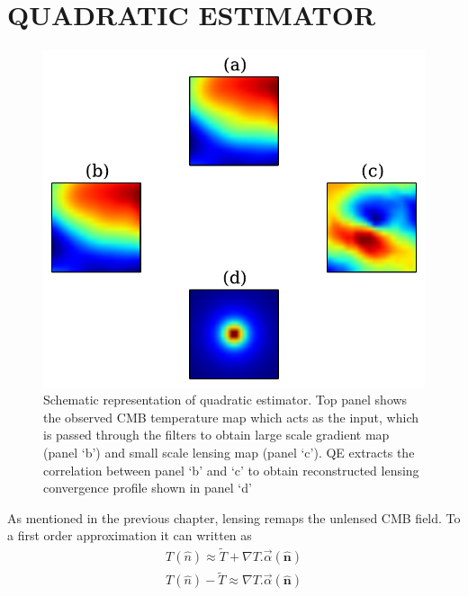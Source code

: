 \section{QUADRATIC ESTIMATOR}
\label{qe}
\begin{figure}[!ht]
\includegraphics[width=\linewidth]{figs/QE_schem.pdf}
\caption{Schematic representation of quadratic estimator. Top panel shows the observed CMB temperature map which acts as the input, which is passed through the filters to obtain large scale gradient map (panel `b') and small scale lensing map (panel `c'). QE extracts the correlation between panel `b' and `c' to obtain reconstructed lensing convergence profile shown in panel `d'}
\label{fig:QE_schem}
\end{figure}
As mentioned in the previous chapter, lensing remaps the unlensed CMB field. To a first order approximation it can written as
\begin{eqnarray}
T (\hat{n})\approx \tilde{T}+ \nabla T . \vec{\alpha}(\hat{\textbf{n}}) \\
T (\hat{n}) - \tilde{T} \approx \nabla T . \vec{\alpha}(\hat{\textbf{n}}) 
\end{eqnarray}
